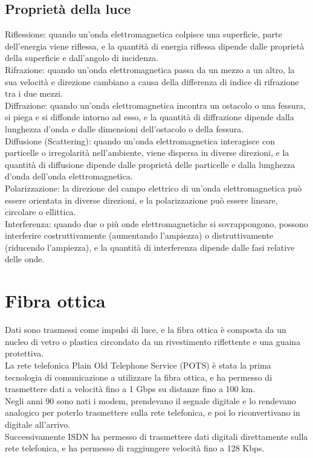 \subsection{Proprietà della luce}
Riflessione: quando un'onda elettromagnetica colpisce una superficie, parte dell'energia viene riflessa, e la quantità di energia riflessa dipende dalle proprietà della superficie e dall'angolo di incidenza.\\
Rifrazione: quando un'onda elettromagnetica passa da un mezzo a un altro, la sua velocità e direzione cambiano a causa della differenza di indice di rifrazione tra i due mezzi.\\
Diffrazione: quando un'onda elettromagnetica incontra un ostacolo o una fessura, si piega e si diffonde intorno ad esso, e la quantità di diffrazione dipende dalla lunghezza d'onda e dalle dimensioni dell'ostacolo o della fessura.\\
Diffusione (Scattering): quando un'onda elettromagnetica interagisce con particelle o irregolarità nell'ambiente, viene dispersa in diverse direzioni, e la quantità di diffusione dipende dalle proprietà delle particelle e dalla lunghezza d'onda dell'onda elettromagnetica.\\
Polarizzazione: la direzione del campo elettrico di un'onda elettromagnetica può essere orientata in diverse direzioni, e la polarizzazione può essere lineare, circolare o ellittica.\\
Interferenza: quando due o più onde elettromagnetiche si sovrappongono, possono interferire costruttivamente (aumentando l'ampiezza) o distruttivamente (riducendo l'ampiezza), e la quantità di interferenza dipende dalle fasi relative delle onde.\\
\section{Fibra ottica}

Dati sono trasmessi come impulsi di luce, e la fibra ottica è composta da un nucleo di vetro o plastica circondato da un rivestimento riflettente e una guaina protettiva.\\
La rete telefonica Plain Old Telephone Service (POTS) è stata la prima tecnologia di comunicazione a utilizzare la fibra ottica, e ha permesso di trasmettere dati a velocità fino a 1
Gbps su distanze fino a 100 km.\\

Negli anni 90 sono nati i modem, prendevano il segnale digitale e lo rendevano analogico per poterlo trasmettere sulla rete telefonica, e poi lo riconvertivano in digitale all'arrivo.\\
Successivamente ISDN ha permesso di trasmettere dati digitali direttamente sulla rete telefonica, e ha permesso di raggiungere velocità fino a 128 Kbps.\\

